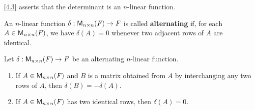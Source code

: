 \begin{note}
	\cref{4.3} asserts that the determinant is an \(n\)-linear function.
\end{note}

\begin{defn}\label{4.5.5}
	An \(n\)-linear function \(\delta : \mathsf{M}_{{n} \times n}({\mathit{F}}) \to \mathit{F}\) is called \textbf{alternating} if, for each \(A \in \mathsf{M}_{{n} \times n}({\mathit{F}})\), we have \(\delta(A) = 0\) whenever two adjacent rows of \(A\) are identical.
\end{defn}

\begin{thm}\label{4.10}
	Let \(\delta : \mathsf{M}_{{n} \times n}({\mathit{F}}) \to \mathit{F}\) be an alternating \(n\)-linear function.
	\begin{enumerate}
		\item If \(A \in \mathsf{M}_{{n} \times n}({\mathit{F}})\) and \(B\) is a matrix obtained from \(A\) by interchanging any two rows of \(A\), then \(\delta(B) = -\delta(A)\).
		\item If \(A \in \mathsf{M}_{{n} \times n}({\mathit{F}})\) has two identical rows, then \(\delta(A) = 0\).
	\end{enumerate}
\end{thm}

